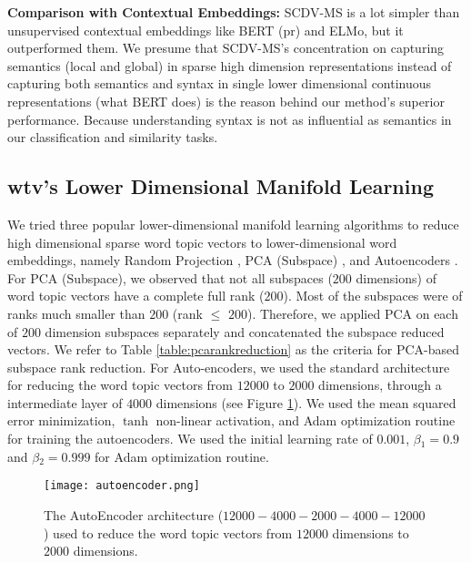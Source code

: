 \documentclass{ecai}
\begin{document}
\vspace{0.5em}
\noindent \textbf{Comparison with Contextual Embeddings: } SCDV-MS is a lot simpler than unsupervised contextual embeddings like BERT (pr) and ELMo, but it outperformed them. We presume that SCDV-MS's concentration on capturing semantics (local and global) in sparse high dimension representations instead of capturing both semantics and syntax in single lower dimensional continuous representations (what BERT does) is the reason behind our method's superior performance. Because understanding syntax is not as influential as semantics in our classification and similarity tasks.

\subsection{wtv's Lower Dimensional Manifold Learning}
\label{subsec:dimreduction}
We tried three popular lower-dimensional manifold learning algorithms to reduce high dimensional sparse word topic vectors to lower-dimensional word embeddings, namely Random Projection \cite{achlioptas2003database}, PCA (Subspace) \cite{abdi2010principal}, and Autoencoders  \cite{vincent2010stacked}. For PCA (Subspace), we observed that not all subspaces ($200$ dimensions) of word topic vectors have a complete full rank ($200$). Most of the subspaces were of ranks much smaller than $200$ (rank $\leq$ $200$). Therefore, we applied PCA on each of $200$ dimension subspaces separately and concatenated the subspace reduced vectors. We refer to Table \ref{table:pcarankreduction} as the criteria for PCA-based subspace rank reduction. For Auto-encoders, we used the standard architecture for reducing the word topic vectors from $12000$ to $2000$ dimensions, through a intermediate layer of $4000$ dimensions (see Figure \ref{fig:ourautoarch}). We used the mean squared error minimization, $\tanh$ non-linear activation, and Adam optimization routine for training the autoencoders. We used the initial learning rate of $0.001$, $\beta$$_1=0.9$ and $\beta$$_2=0.999$ for Adam optimization routine. 
\begin{figure}
\vspace{-0.5em}
\captionsetup{font=small, skip=0.0pt}
\centering
\texttt{[image: autoencoder.png]}
\vspace{1.0em}
\caption{The AutoEncoder architecture ($12000-4000-2000-4000-12000$) used to reduce the word topic vectors from $12000$ dimensions to $2000$ dimensions. }
\label{fig:ourautoarch}
\vspace{-1.5em}
\end{figure}
\end{document}
